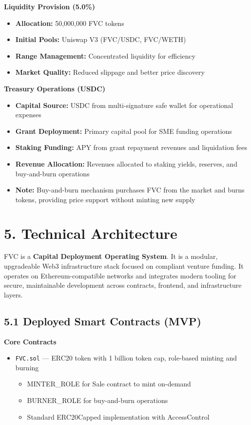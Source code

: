 \documentclass[
  paper=a4,
  ,captions=tableheading
]{scrartcl}
\newcommand{\passthrough}[1]{#1}
\providecommand{\tightlist}{%
  \setlength{\itemsep}{0pt}\setlength{\parskip}{0pt}}
\begin{document}
\textbf{Liquidity Provision (5.0\%)}

\begin{itemize}
\tightlist
\item
  \textbf{Allocation:} 50,000,000 FVC tokens
\item
  \textbf{Initial Pools:} Uniswap V3 (FVC/USDC, FVC/WETH)
\item
  \textbf{Range Management:} Concentrated liquidity for efficiency
\item
  \textbf{Market Quality:} Reduced slippage and better price discovery
\end{itemize}

\textbf{Treasury Operations (USDC)}

\begin{itemize}
\tightlist
\item
  \textbf{Capital Source:} USDC from multi-signature safe wallet for operational expenses
\item
  \textbf{Grant Deployment:} Primary capital pool for SME funding operations
\item
  \textbf{Staking Funding:} APY from grant repayment revenues and liquidation fees
\item
  \textbf{Revenue Allocation:} Revenues allocated to staking yields, reserves, and buy-and-burn operations
\item
  \textbf{Note:} Buy-and-burn mechanism purchases FVC from the market and burns tokens, providing price support without minting new supply
\end{itemize}


\section{5. Technical Architecture}\label{technical-architecture}

FVC is a \textbf{Capital Deployment Operating System}. It is a modular, upgradeable Web3 infrastructure stack focused
on compliant venture funding. It operates on Ethereum-compatible
networks and integrates modern tooling for secure, maintainable
development across contracts, frontend, and infrastructure layers.

\subsection{5.1 Deployed Smart Contracts (MVP)}\label{deployed-smart-contracts}

\textbf{Core Contracts}

\begin{itemize}
\tightlist
\item
  \passthrough{\lstinline!FVC.sol!} --- ERC20 token with 1 billion token cap, role-based minting and burning
  \begin{itemize}
  \tightlist
  \item
    MINTER\_ROLE for Sale contract to mint on-demand
  \item
    BURNER\_ROLE for buy-and-burn operations
  \item
    Standard ERC20Capped implementation with AccessControl
  \end{itemize}
\end{itemize}
\end{document}
